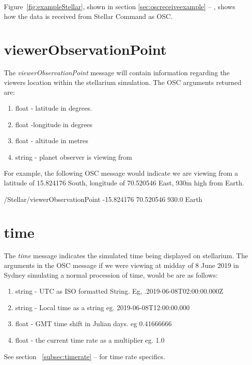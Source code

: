 Figure~\ref{fig:exampleStellar},  shown in  section \ref{sec:oscreceiveexample} --
\emph{}, shows how the data is received from Stellar Command as OSC.

\section{viewerObservationPoint}
The \textit{viewerObservationPoint} message will contain information regarding the viewers location within the stellarium simulation. The OSC arguments returned are:
\begin{enumerate}
	\item float - latitude in degrees. 
	\item float -longitude in degrees
	\item float - altitude in metres
	\item string - planet  observer is viewing from
\end{enumerate}

For example, the following OSC message would indicate we are viewing from a latitude of 15.824176 South, longitude of 70.520546 East, 930m high from Earth.

\begin{syntax}
	/Stellar/viewerObservationPoint -15.824176 70.520546 930.0 Earth
\end{syntax}

\section{time}  
The \textit{time} message indicates the simulated time being displayed on stellarium. The arguments in the OSC message if we were viewing at midday of 8 June 2019 in Sydney simulating a normal procession of time, would be are as follows:
\begin{enumerate}
	\item string - UTC as ISO formatted String. Eg, .2019-06-08T02:00:00.000Z
	\item string - Local time as a string eg. 2019-06-08T12:00:00.000
	\item float - GMT time shift in Julian days. eg 0.41666666
	\item float - the current time rate as a multiplier eg. 1.0
\end{enumerate}

See section ~\ref{subsec:timerate} --
\emph{} for time rate specifics.